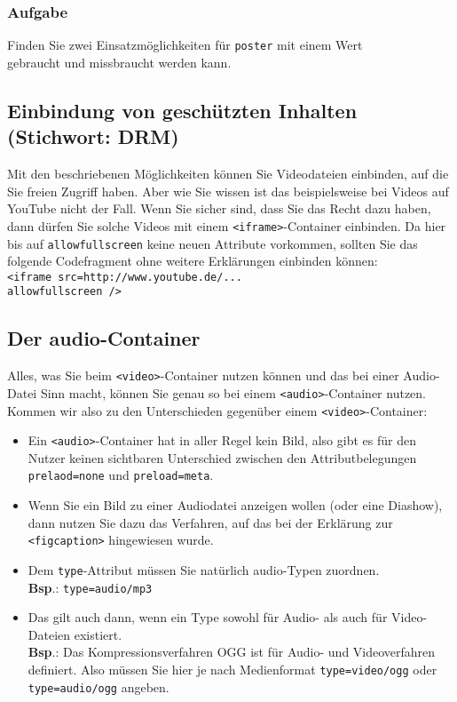 \subsubsection{Aufgabe}

Finden Sie zwei Einsatzmöglichkeiten für \verb|poster| mit einem Wert \\gebraucht und missbraucht werden kann.

\subsection{Einbindung von geschützten Inhalten (Stichwort: DRM)}

Mit den beschriebenen Möglichkeiten können Sie Videodateien einbinden, auf die Sie freien Zugriff haben. Aber wie Sie wissen ist das beispielsweise bei Videos auf YouTube nicht der Fall. Wenn Sie sicher sind, dass Sie das Recht dazu haben, dann dürfen Sie solche Videos mit einem \verb|<iframe>|-Container einbinden. Da hier bis auf \verb|allowfullscreen| keine neuen Attribute vorkommen, sollten Sie das folgende Codefragment ohne weitere Erklärungen einbinden können:\\

\verb|<iframe src=http://www.youtube.de/...|\\\verb|allowfullscreen />|

\subsection{Der audio-Container}

Alles, was Sie beim \verb|<video>|-Container nutzen können und das bei einer Audio-Datei Sinn macht, können Sie genau so bei einem \verb|<audio>|-Container nutzen. Kommen wir also zu den Unterschieden gegenüber einem \verb|<video>|-Container:

\begin{itemize}
	\item Ein \verb|<audio>|-Container hat in aller Regel kein Bild, also gibt es für den Nutzer keinen sichtbaren Unterschied zwischen den Attributbelegungen \verb|prelaod=none| und \verb|preload=meta|.
	\item Wenn Sie ein Bild zu einer Audiodatei anzeigen wollen (oder eine Diashow), dann nutzen Sie dazu das Verfahren, auf das bei der Erklärung zur \verb|<figcaption>| hingewiesen wurde.
	\item Dem \verb|type|-Attribut müssen Sie natürlich audio-Typen zuordnen.\\
	\textbf{Bsp}.: \verb|type=audio/mp3|
	\item Das gilt auch dann, wenn ein Type sowohl für Audio- als auch für Video-Dateien existiert.\\
	\textbf{Bsp}.: Das Kompressionsverfahren OGG ist für Audio- und Videoverfahren definiert. Also müssen Sie hier je nach Medienformat \verb|type=video/ogg| oder \verb|type=audio/ogg| angeben.
\end{itemize}

